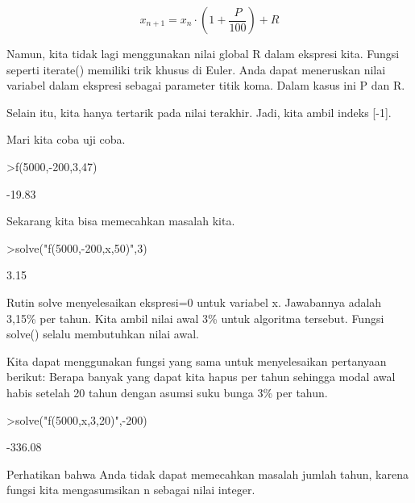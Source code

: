 \documentclass[a4paper,10pt]{article}
\begin{document}
\begin{eulernotebook}
\begin{eulercomment}
\begin{eulercomment}
\begin{eulercomment}
\begin{eulercomment}
\begin{eulercomment}
\begin{eulercomment}
\begin{eulercomment}
\begin{eulercomment}
\begin{eulercomment}
\begin{eulercomment}
\begin{eulercomment}
\end{eulercomment}
\begin{eulerformula}
\[
x_{n+1} = x_n \cdot \left(1+ \frac{P}{100}\right) + R
\]
\end{eulerformula}
\begin{eulercomment}
Namun, kita tidak lagi menggunakan nilai global R dalam ekspresi kita.
Fungsi seperti iterate() memiliki trik khusus di Euler. Anda dapat
meneruskan nilai variabel dalam ekspresi sebagai parameter titik koma.
Dalam kasus ini P dan R.

Selain itu, kita hanya tertarik pada nilai terakhir. Jadi, kita ambil
indeks [-1].

Mari kita coba uji coba.
\end{eulercomment}
\begin{eulerprompt}
>f(5000,-200,3,47)
\end{eulerprompt}
\begin{euleroutput}
       -19.83 
\end{euleroutput}
\begin{eulercomment}
Sekarang kita bisa memecahkan masalah kita.
\end{eulercomment}
\begin{eulerprompt}
>solve("f(5000,-200,x,50)",3)
\end{eulerprompt}
\begin{euleroutput}
         3.15 
\end{euleroutput}
\begin{eulercomment}
Rutin solve menyelesaikan ekspresi=0 untuk variabel x. Jawabannya
adalah 3,15\% per tahun. Kita ambil nilai awal 3\% untuk algoritma
tersebut. Fungsi solve() selalu membutuhkan nilai awal.

Kita dapat menggunakan fungsi yang sama untuk menyelesaikan pertanyaan
berikut: Berapa banyak yang dapat kita hapus per tahun sehingga modal
awal habis setelah 20 tahun dengan asumsi suku bunga 3\% per tahun.
\end{eulercomment}
\begin{eulerprompt}
>solve("f(5000,x,3,20)",-200)
\end{eulerprompt}
\begin{euleroutput}
      -336.08 
\end{euleroutput}
\begin{eulercomment}
Perhatikan bahwa Anda tidak dapat memecahkan masalah jumlah tahun,
karena fungsi kita mengasumsikan n sebagai nilai integer.


\end{eulercomment}
\end{eulercomment}
\end{eulercomment}
\end{eulercomment}
\end{eulercomment}
\end{eulercomment}
\end{eulercomment}
\end{eulercomment}
\end{eulercomment}
\end{eulercomment}
\end{eulercomment}
\end{eulernotebook}
\end{document}
